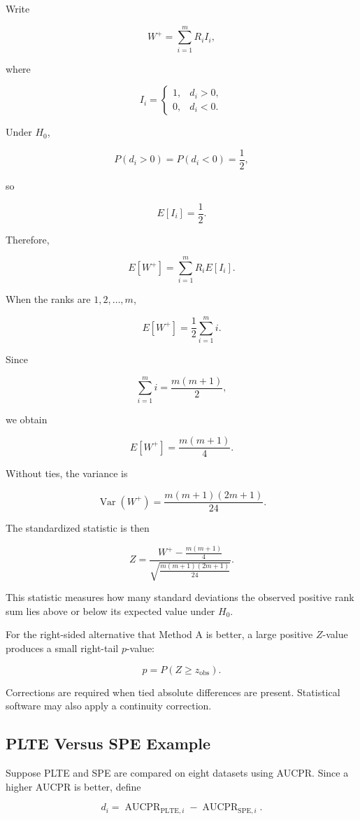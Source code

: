 \documentclass[11pt]{article}
\begin{document}
Write

\[
W^+
=
\sum_{i=1}^{m}R_iI_i,
\]

where

\[
I_i=
\begin{cases}
1, & d_i>0,\\
0, & d_i<0.
\end{cases}
\]

Under \(H_0\),

\[
P(d_i>0)=P(d_i<0)=\frac{1}{2},
\]

so

\[
E[I_i]=\frac{1}{2}.
\]

Therefore,

\[
E[W^+]
=
\sum_{i=1}^{m}R_iE[I_i].
\]

When the ranks are \(1,2,\ldots,m\),

\[
E[W^+]
=
\frac{1}{2}\sum_{i=1}^{m}i.
\]

Since

\[
\sum_{i=1}^{m}i
=
\frac{m(m+1)}{2},
\]

we obtain

\[
\boxed{
E[W^+]
=
\frac{m(m+1)}{4}.
}
\]

Without ties, the variance is

\[
\boxed{
\operatorname{Var}(W^+)
=
\frac{m(m+1)(2m+1)}{24}.
}
\]

The standardized statistic is then

\[
\boxed{
Z
=
\frac{
W^+-\frac{m(m+1)}{4}
}{
\sqrt{
\frac{m(m+1)(2m+1)}{24}
}
}.
}
\]

This statistic measures how many standard deviations the observed
positive rank sum lies above or below its expected value under \(H_0\).

For the right-sided alternative that Method A is better, a large positive
\(Z\)-value produces a small right-tail \(p\)-value:

\[
p=P(Z\geq z_{\mathrm{obs}}).
\]

Corrections are required when tied absolute differences are present.
Statistical software may also apply a continuity correction.

\subsection{PLTE Versus SPE Example}

Suppose PLTE and SPE are compared on eight datasets using AUCPR. Since a
higher AUCPR is better, define

\[
d_i
=
\operatorname{AUCPR}_{\mathrm{PLTE},i}
-
\operatorname{AUCPR}_{\mathrm{SPE},i}.
\]
\end{document}
